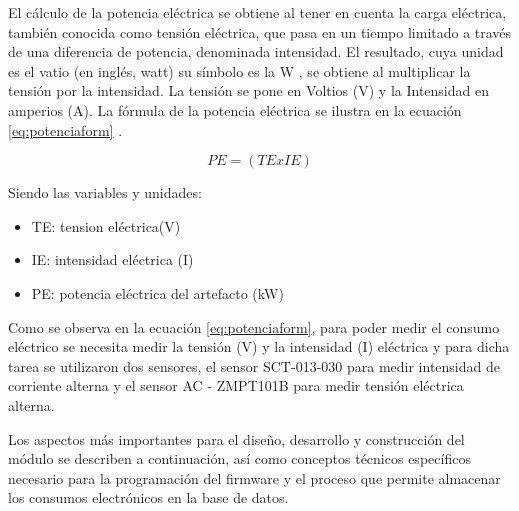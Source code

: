 \vspace{0.2cm}

El cálculo de la potencia eléctrica se obtiene al tener en cuenta la carga eléctrica, también conocida como tensión eléctrica, que pasa en un tiempo limitado a través de una diferencia de potencia, denominada intensidad. El resultado, cuya unidad es el vatio (en inglés, watt) su símbolo es la W , se obtiene al multiplicar la tensión por la intensidad. La tensión se pone en Voltios (V) y la Intensidad en amperios (A). La fórmula de la potencia eléctrica se ilustra en la ecuación \ref{eq:potenciaform} \citep{WEBSITE:20}.

\begin{equation}
	\label{eq:potenciaform}
	PE = \left( TE x IE \right)
\end{equation}

\vspace{0.2cm}
Siendo las variables y unidades:
\begin{itemize}
\item TE: tension eléctrica(V)
\item IE: intensidad eléctrica (I)
\item PE: potencia eléctrica del artefacto (kW)
\end{itemize}


Como se observa en la ecuación \ref{eq:potenciaform}, para poder medir el consumo eléctrico se necesita medir la tensión (V) y la intensidad (I) eléctrica y para dicha tarea se utilizaron dos sensores, el sensor SCT-013-030 para medir intensidad de corriente alterna y el sensor AC - ZMPT101B para medir tensión eléctrica alterna.

Los aspectos más importantes para el diseño, desarrollo y construcción del módulo se describen  a continuación, así como conceptos técnicos específicos necesario para la programación del firmware y el proceso que permite almacenar los consumos electrónicos en la base de datos.


